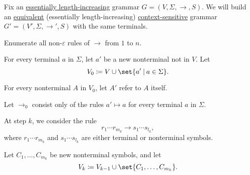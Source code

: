 \begin{algorithm}\label{alg:length_increasing_to_context_sensitive}
  Fix an \hyperref[def:length_increasing_grammar]{essentially length-increasing} grammar \( G = (V, \Sigma, \to, S) \). We will build an \hyperref[def:formal_grammar/equivalent]{equivalent} (essentially length-increasing) \hyperref[def:chomsky_hierarchy/context_sensitive]{context-sensitive} grammar \( G' = (V', \Sigma, \to', S) \) with the same terminals.

  Enumerate all non-\( \varepsilon \) rules of \( \to \) from \( 1 \) to \( n \).

  \begin{thmenum}
     For every terminal \( a \) in \( \Sigma \), let \( a' \) be a new nonterminal not in \( V \). Let
    \begin{equation*}
      V_0 \coloneqq V \cup \set{ a' \given a \in \Sigma }.
    \end{equation*}

    For every nonterminal \( A \) in \( V_0 \), let \( A' \) refer to \( A \) itself.

    Let \( {\to_0} \) consist only of the rules \( a' \mapsto a \) for every terminal \( a \) in \( \Sigma \).

     At step \( k \), we consider the rule
    \begin{equation*}
      r_1 \cdots r_{m_k} \to s_1 \cdots s_{l_k},
    \end{equation*}
    where \( r_1 \cdots r_{m_k} \) and \( s_1 \cdots s_{l_k} \) are either terminal or nonterminal symbols.

    Let \( C_1, \ldots, C_{m_k} \) be new nonterminal symbols, and let
    \begin{equation*}
      V_k \coloneqq V_{k-1} \cup \set{ C_1, \ldots, C_{m_k} }.
    \end{equation*}


\end{thmenum}
\end{algorithm}
